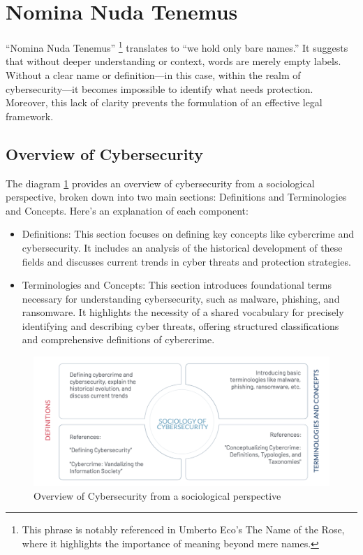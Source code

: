 \clearpage

\section{Nomina Nuda Tenemus}
“Nomina Nuda Tenemus” \footnote{This phrase is notably referenced in Umberto Eco’s The Name of the Rose, where it highlights the importance of meaning beyond mere names.} translates to “we hold only bare names.” It suggests that without deeper understanding or context, words are merely empty labels. 
Without a clear name or definition—in this case, within the realm of cybersecurity—it becomes impossible to identify what needs protection. Moreover, this lack of clarity prevents the formulation of an effective legal framework.
\subsection{Overview of Cybersecurity}
The diagram \ref{fig:Overview} provides an overview of cybersecurity from a sociological perspective, broken down into two main sections: Definitions and Terminologies and Concepts. Here's an explanation of each component:
\begin{itemize}
    \item Definitions: This section focuses on defining key concepts like cybercrime and cybersecurity. It includes an analysis of the historical development of these fields and discusses current trends in cyber threats and protection strategies.
    \item Terminologies and Concepts: This section introduces foundational terms necessary for understanding cybersecurity, such as malware, phishing, and ransomware. It highlights the necessity of a shared vocabulary for precisely identifying and describing cyber threats, offering structured classifications and comprehensive definitions of cybercrime.
\end{itemize}

\begin{figure}[H]
    \includegraphics[width=\linewidth]{Images/Sociology/Overview.png}
    \caption{Overview of Cybersecurity from a sociological perspective}
    \label{fig:Overview}
\end{figure}

